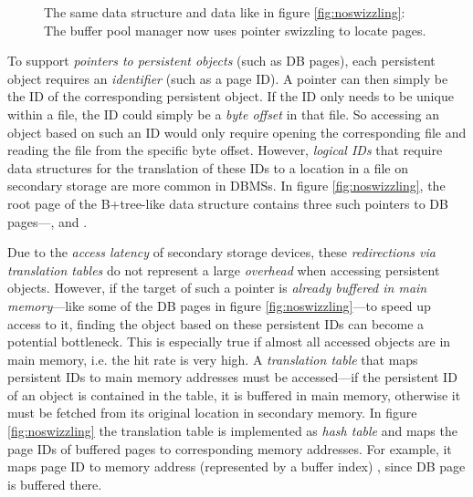 \begin{@empty}
\begin{figure}[ht]
\begin{adjustbox}{width = \linewidth}
        \end{adjustbox}
        \vspace{.75em}
        \caption[Partially buffered B+tree with pointer swizzling]{The same data structure and data like in figure \ref{fig:noswizzling}: The buffer pool manager now uses pointer swizzling to locate pages.}
        \label{fig:swizzling}
    \end{figure}

    To support \emph{pointers to persistent objects} (such as DB pages), each persistent object requires an \emph{identifier} (such as a page ID). A pointer can then simply be the ID of the corresponding persistent object. If the ID only needs to be unique within a file, the ID could simply be a \emph{byte offset} in that file. So accessing an object based on such an ID would only require opening the corresponding file and reading the file from the specific byte offset. However, \emph{logical IDs} that require data structures for the translation of these IDs to a location in a file on secondary storage are more common in DBMSs. In figure \ref{fig:noswizzling}, the root page of the B+tree-like data structure contains three such pointers to DB pages---,  and .

    Due to the \emph{access latency} of secondary storage devices, these \emph{redirections via translation tables} do not represent a large \emph{overhead} when accessing persistent objects. However, if the target of such a pointer is \emph{already buffered in main memory}---like some of the DB pages in figure \ref{fig:noswizzling}---to speed up access to it, finding the object based on these persistent IDs can become a potential bottleneck. This is especially true if almost all accessed objects are in main memory, i.e. the hit rate is very high. A \emph{translation table} that maps persistent IDs to main memory addresses must be accessed---if the persistent ID of an object is contained in the table, it is buffered in main memory, otherwise it must be fetched from its original location in secondary memory. In figure \ref{fig:noswizzling} the translation table is implemented as \emph{hash table} and maps the page IDs of buffered pages to corresponding memory addresses. For example, it maps page ID  to memory address (represented by a buffer index) , since DB page  is buffered there.


\end{@empty}
